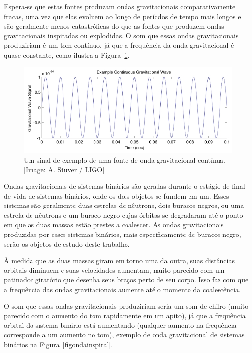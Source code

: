 Espera-se que estas fontes produzam ondas gravitacionais comparativamente fracas, uma vez que elas evoluem ao longo de períodos de tempo mais longos e são geralmente menos catastróficas do que as fontes que produzem ondas gravitacionais inspiradas ou explodidas. O som que essas ondas gravitacionais produziriam é um tom contínuo, já que a frequência da onda gravitacional é quase constante, como ilustra a Figura~\ref{figondacontinua}.

\begin{figure}[ht]
\centering
\includegraphics[width=.9\textwidth]{figuras/continuous_tn.jpg}
\caption{Um sinal de exemplo de uma fonte de onda gravitacional contínua. [Image: A. Stuver / LIGO]}
\label{figondacontinua}
\end{figure}

Ondas gravitacionais de sistemas binários são geradas durante o estágio de final de vida de sistemas binários, onde os dois objetos se fundem em um. Esses sistemas são geralmente duas estrelas de nêutrons, dois buracos negros, ou uma estrela de nêutrons e um buraco negro cujas órbitas se degradaram até o ponto em que as duas massas estão prestes a coalescer. As ondas gravitacionais produzidas por esses sistemas binários, mais especificamente de buracos negro, serão os objetos de estudo deste trabalho.

À medida que as duas massas giram em torno uma da outra, suas distâncias orbitais diminuem e suas velocidades aumentam, muito parecido com um patinador giratório que desenha seus braços perto de seu corpo. Isso faz com que a frequência das ondas gravitacionais aumente até o momento da coalescência. 

O som que essas ondas gravitacionais produziriam seria um som de chilro (muito parecido com o aumento do tom rapidamente em um apito), já que a frequência orbital do sistema binário está aumentando (qualquer aumento na frequência corresponde a um aumento no tom), exemplo de onda gravitacional de sistemas binários na Figura~\ref{figondainspiral}.

